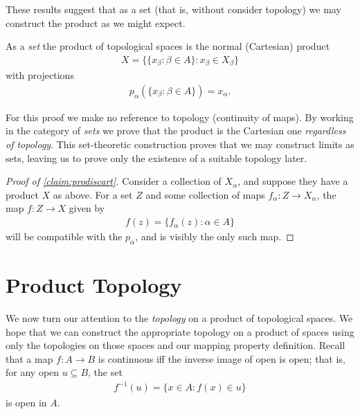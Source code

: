       These results suggest that as a set (that is, without consider topology) we may construct the product as we might expect.
      \begin{claim}
        \label{claim:prodiscart}
        As a \emph{set} the product of topological spaces is the normal (Cartesian) product
        \begin{align*}
          X = \{\{x_\beta:\beta\in A\}: x_\beta\in X_\beta\}
        \end{align*}
        with projections
        \begin{align*}
          p_\alpha(\{x_\beta:\beta\in A\}) = x_\alpha\text{.}
        \end{align*}
        \begin{rmk}
          For this proof we make no reference to topology (continuity of maps).
          By working in the category of \emph{sets} we prove that the product is the Cartesian one \emph{regardless of topology}.
          This set-theoretic construction proves that we may construct limits as sets, leaving us to prove only the existence of a suitable topology later.
        \end{rmk}
        \begin{proof}[Proof of \cref{claim:prodiscart}]
          Consider a collection of $X_\alpha$, and suppose they have a product $X$ as above.
          For a set $Z$ and some collection of maps $f_\alpha:Z\rightarrow X_\alpha$, the map $f:Z\rightarrow X$ given by
          \begin{align*}
            f(z) = \{f_\alpha(z):\alpha\in A\}
          \end{align*}
          will be compatible with the $p_\alpha$, and is visibly the only such map.
        \end{proof}
      \end{claim}

    \section{Product Topology}
      We now turn our attention to the \emph{topology} on a product of topological spaces.
      We hope that we can construct the appropriate topology on a product of spaces using only the topologies on those spaces and our mapping property definition.
      Recall that a map $f:A\rightarrow B$ is continuous iff the inverse image of open is open; that is, for any open $u\subseteq B$, the set
      \begin{align*}
        f^{-1}(u) = \{x\in A:f(x)\in u\}
      \end{align*}
      is open in $A$.

